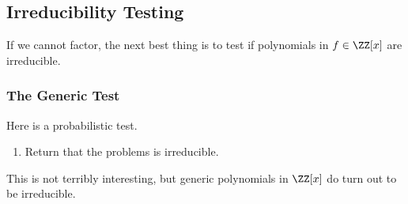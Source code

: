 \subsection{Irreducibility Testing}
If we cannot factor, the next best thing is to test if polynomials in $f\in \ZZ[x]$ are irreducible.

\subsubsection{The Generic Test}
Here is a probabilistic test.
\begin{enumerate}
	\item Return that the problems is irreducible.
\end{enumerate}
This is not terribly interesting, but generic polynomials in $\ZZ[x]$ do turn out to be irreducible.


